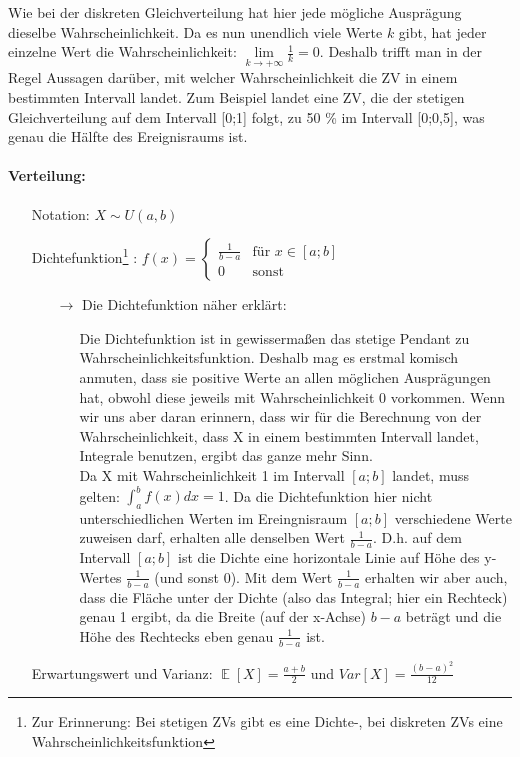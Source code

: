 \documentclass[a4paper]{article}
\DeclareMathOperator*{\E}{\mathbb{E}}
\begin{document}
\noindent Wie bei der diskreten Gleichverteilung hat hier jede mögliche Ausprägung dieselbe Wahrscheinlichkeit. Da es nun unendlich viele Werte $k$ gibt, hat jeder einzelne Wert die Wahrscheinlichkeit: $\lim\limits_{k \rightarrow +\infty}{\frac{1}{k}}=0$. Deshalb trifft man in der Regel Aussagen darüber, mit welcher Wahrscheinlichkeit die ZV in einem bestimmten Intervall landet. Zum Beispiel landet eine ZV, die der stetigen Gleichverteilung auf dem Intervall [0;1] folgt, zu 50 \% im Intervall [0;0,5], was genau die Hälfte des Ereignisraums ist.

\paragraph{Verteilung:}
\begin{itemize}
\item[] Notation: $X \sim U(a,b)$
\item[] Dichtefunktion\footnote{Zur Erinnerung: Bei stetigen ZVs gibt es eine Dichte-, bei diskreten ZVs eine Wahrscheinlichkeitsfunktion} : $f(x)=\begin{cases}
			\frac{1}{b-a} & \text{für $x \in [a;b]$}\\
            0 & \text{sonst}
		 \end{cases}$ 
	\begin{itemize}
	\item[$\rightarrow$] Die Dichtefunktion näher erklärt:
		\begin{itemize}
		\item[] Die Dichtefunktion ist in gewissermaßen das stetige Pendant zu Wahrscheinlichkeitsfunktion. Deshalb mag es erstmal komisch anmuten, dass sie positive Werte an allen möglichen Ausprägungen hat, obwohl diese jeweils mit Wahrscheinlichkeit 0 vorkommen. Wenn wir uns aber daran erinnern, dass wir für die Berechnung von der Wahrscheinlichkeit, dass X in einem bestimmten Intervall landet, Integrale benutzen, ergibt das ganze mehr Sinn. \\
		\noindent Da X mit Wahrscheinlichkeit 1 im Intervall $[a;b]$ landet, muss gelten: $\int_{a}^{b} f(x)dx = 1$. Da die Dichtefunktion hier nicht unterschiedlichen Werten im Ereingnisraum $[a;b]$ verschiedene Werte zuweisen darf, erhalten alle denselben Wert $\frac{1}{b-a}$. D.h. auf dem Intervall $[a;b]$ ist die Dichte eine horizontale Linie auf Höhe des y-Wertes $\frac{1}{b-a}$ (und sonst 0). Mit dem Wert $\frac{1}{b-a}$ erhalten wir aber auch, dass die Fläche unter der Dichte (also das Integral; hier ein Rechteck) genau 1 ergibt, da die Breite (auf der x-Achse) $b-a$ beträgt und die Höhe des Rechtecks eben genau $\frac{1}{b-a}$ ist.
		\end{itemize}
	\end{itemize}
\item[] Erwartungswert und Varianz: $\E[X]= \frac{a+b}{2}$ und $Var[X]=\frac{(b-a)^2}{12}$
\end{itemize}
\end{document}
